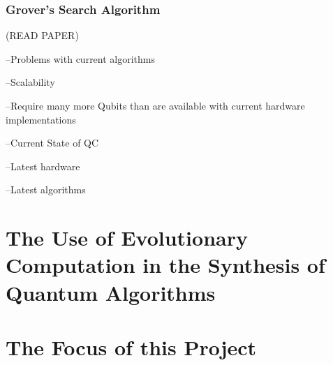 \documentclass[authoryearcitations]{UoYCSproject}
\begin{document}
\subsubsection{Grover's Search Algorithm}	
(READ PAPER)

--Problems with current algorithms

	--Scalability
	
	--Require many more Qubits than are available with current hardware implementations


--Current State of QC
	
	--Latest hardware
	
	--Latest algorithms

\section{The Use of Evolutionary Computation in the Synthesis of Quantum Algorithms}

\section{The Focus of this Project}


\end{document}
